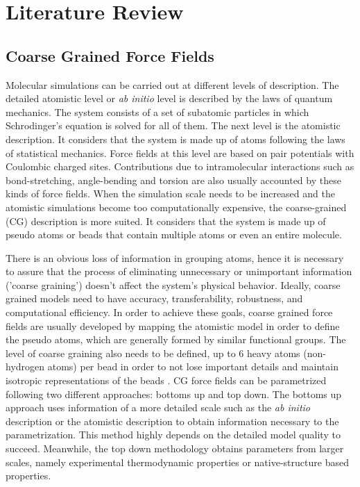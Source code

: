 
\chapter{Literature Review} %

\label{Chapter2} %



\section{Coarse Grained Force Fields}

Molecular simulations can be carried out at different levels of description. The detailed atomistic level or \textit{ab initio} level is described by the laws of quantum mechanics. The system consists of a set of subatomic particles in which Schrodinger's equation is solved for all of them. The next level is the atomistic description. It considers that the system is made up of atoms following the laws of statistical mechanics.  Force fields at this level are based on pair potentials with Coulombic charged sites. Contributions due to intramolecular interactions such as bond-stretching, angle-bending and torsion are also usually accounted by these kinds of force fields. When the simulation scale needs to be increased and the atomistic simulations become too computationally expensive, the coarse-grained (CG) description is more suited. It considers that the system is made up of pseudo atoms or beads that contain multiple atoms or even an entire molecule. 

There is an obvious loss of information in grouping atoms, hence it is necessary to assure that the process of eliminating unnecessary or unimportant information ('coarse graining') doesn't affect the system's physical behavior. Ideally, coarse grained models need to have accuracy, transferability, robustness, and computational efficiency. In order to achieve these goals, coarse grained force fields are usually developed by mapping the atomistic model in order to define the pseudo atoms, which are generally formed by similar functional groups. The level of coarse graining also needs to be defined, up to 6 heavy atoms (non-hydrogen atoms) per bead in order to not lose important details and maintain isotropic representations of the beads \cite{shinoda2007,martini2007,hadley2012}. CG force fields can be parametrized following two different approaches: bottoms up and top down. The bottoms up approach uses information of a more detailed scale such as the \textit{ab initio} description or the atomistic description to obtain information necessary to the parametrization. This method highly depends on the detailed model quality to succeed. Meanwhile, the top down methodology obtains parameters from larger scales, namely experimental thermodynamic properties or native-structure based properties. 

